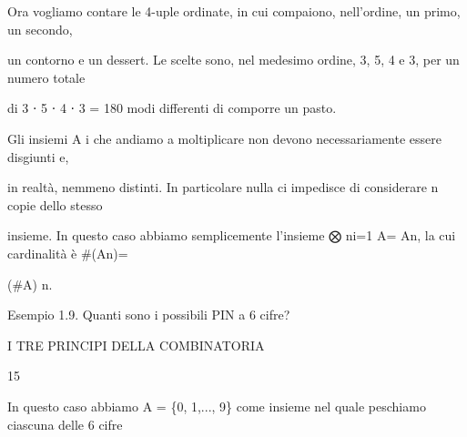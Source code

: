 \documentclass[a4paper,portrait,12pt]{article}
\begin{document}
\begin{flushleft}
Ora vogliamo contare le 4-uple ordinate, in cui compaiono, nell'ordine, un primo, un secondo,
\end{flushleft}


\begin{flushleft}
un contorno e un dessert. Le scelte sono, nel medesimo ordine, 3, 5, 4 e 3, per un numero totale
\end{flushleft}


\begin{flushleft}
di 3 ⋅ 5 ⋅ 4 ⋅ 3 = 180 modi differenti di comporre un pasto.
\end{flushleft}


\begin{flushleft}
Gli insiemi A i che andiamo a moltiplicare non devono necessariamente essere disgiunti e,
\end{flushleft}


\begin{flushleft}
in realt\`{a}, nemmeno distinti. In particolare nulla ci impedisce di considerare n copie dello stesso
\end{flushleft}


\begin{flushleft}
insieme. In questo caso abbiamo semplicemente l'insieme ⨂ ni=1 A= An, la cui cardinalit\`{a} \`{e} \#(An)=
\end{flushleft}


\begin{flushleft}
(\#A) n.
\end{flushleft}


\begin{flushleft}
Esempio 1.9. Quanti sono i possibili PIN a 6 cifre?
\end{flushleft}





\begin{flushleft}
 I TRE PRINCIPI DELLA COMBINATORIA
\end{flushleft}





15





\begin{flushleft}
In questo caso abbiamo A = \{0, 1,..., 9\} come insieme nel quale peschiamo ciascuna delle 6 cifre
\end{flushleft}
\end{document}
